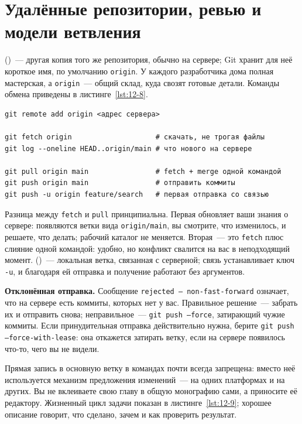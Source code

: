 \section{Удалённые репозитории, ревью и модели ветвления}

 ()~--- другая копия того же репозитория, обычно на сервере; Git хранит для неё короткое имя, по умолчанию \texttt{origin}. У каждого разработчика дома полная мастерская, а \texttt{origin}~--- общий склад, куда свозят готовые детали. Команды обмена приведены в листинге~\ref{lst:12-8}.

\begin{listing}[H]
\begin{verbatim}
git remote add origin <адрес сервера>

git fetch origin                    # скачать, не трогая файлы
git log --oneline HEAD..origin/main # что нового на сервере

git pull origin main                # fetch + merge одной командой
git push origin main                # отправить коммиты
git push -u origin feature/search   # первая отправка со связью
\end{verbatim}
\caption{Обмен с удалённым репозиторием}
\label{lst:12-8}
\end{listing}

Разница между \texttt{fetch} и \texttt{pull} принципиальна. Первая обновляет ваши знания о сервере: появляются ветки вида \texttt{origin/main}, вы смотрите, что изменилось, и решаете, что делать; рабочий каталог не меняется. Вторая~--- это \texttt{fetch} плюс слияние одной командой: удобно, но конфликт свалится на вас в неподходящий момент.  ()~--- локальная ветка, связанная с серверной; связь устанавливает ключ \texttt{-u}, и благодаря ей отправка и получение работают без аргументов.

\begin{oshibka}
\textbf{Отклонённая отправка.} Сообщение \texttt{rejected~--- non-fast-forward} означает, что на сервере есть коммиты, которых нет у вас. Правильное решение~--- забрать их и отправить снова; неправильное~--- \texttt{git push --force}, затирающий чужие коммиты. Если принудительная отправка действительно нужна, берите \texttt{git push --force-with-lease}: она откажется затирать ветку, если на сервере появилось что-то, чего вы не видели.
\end{oshibka}

Прямая запись в основную ветку в командах почти всегда запрещена: вместо неё используется механизм предложения изменений~---  на одних платформах и  на других. Вы не вклеиваете свою главу в общую монографию сами, а приносите её редактору. Жизненный цикл задачи показан в листинге~\ref{lst:12-9}; хорошее описание говорит, что сделано, зачем и как проверить результат.

